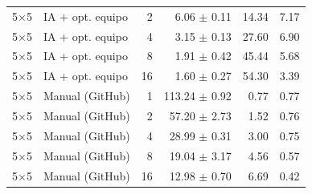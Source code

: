\begin{tabular}{llrrrr}
5$\times$5 & IA + opt. equipo & 2 & 6.06 $\pm$ 0.11 & 14.34 & 7.17 \\
5$\times$5 & IA + opt. equipo & 4 & 3.15 $\pm$ 0.13 & 27.60 & 6.90 \\
5$\times$5 & IA + opt. equipo & 8 & 1.91 $\pm$ 0.42 & 45.44 & 5.68 \\
5$\times$5 & IA + opt. equipo & 16 & 1.60 $\pm$ 0.27 & 54.30 & 3.39 \\
5$\times$5 & Manual (GitHub) & 1 & 113.24 $\pm$ 0.92 & 0.77 & 0.77 \\
5$\times$5 & Manual (GitHub) & 2 & 57.20 $\pm$ 2.73 & 1.52 & 0.76 \\
5$\times$5 & Manual (GitHub) & 4 & 28.99 $\pm$ 0.31 & 3.00 & 0.75 \\
5$\times$5 & Manual (GitHub) & 8 & 19.04 $\pm$ 3.17 & 4.56 & 0.57 \\
5$\times$5 & Manual (GitHub) & 16 & 12.98 $\pm$ 0.70 & 6.69 & 0.42 \\
\bottomrule
\end{tabular}
